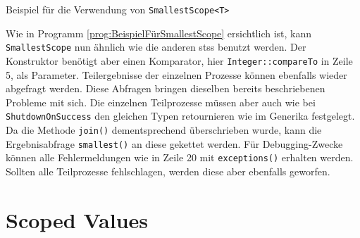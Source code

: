     \begin{program} [H]
        \caption{Beispiel für die Verwendung von \texttt{SmallestScope<T>}}
        \label{prog:VerwendungVonSmallestScope}
    \begin{JavaCode}[language=Java, numbers=left]
public static void scopesSmallest() {
    StructuredTaskScope.Subtask<Integer> result1 = null;
    Integer result = null;

    try (var scope = new SmallestScope<Integer>(Integer::compareTo)) {                                         
        result1 = scope.fork(() -> { 
            Thread.sleep(1000); 
            return 4; 
        });
        scope.fork(() -> { throw new RuntimeException("Task 2 failed"); });
        scope.fork(() -> { 
            Thread.sleep(2000); 
            return 3; 
        });

        result = scope.join().smallest();
        if (result1.state() == StructuredTaskScope.Subtask.State.SUCCESS) {
            System.out.println(STR."result from the 1st Thread: \{result1.get()}");
        }
        scope.exceptions().printStackTrace();
    } catch (Exception e) {
        e.printStackTrace();
    }
    System.out.println(STR."smallest result: \{result}");
}\end{JavaCode}
    \end{program}
    Wie in Programm \ref{prog:BeispielFürSmallestScope} ersichtlich ist, kann \texttt{SmallestScope} nun ähnlich wie die anderen \Glspl{sts} benutzt werden. Der Konstruktor benötigt
    aber einen Komparator, hier \texttt{Integer::compare\-To} in Zeile 5, als Parameter. Teilergebnisse der einzelnen Prozesse können ebenfalls wieder abgefragt werden. Diese Abfragen
    bringen dieselben bereits beschriebenen Probleme mit sich. Die einzelnen Teilprozesse müssen 
    aber auch wie bei \texttt{ShutdownOnSuccess} den gleichen Typen retournieren wie im Generika festgelegt. Da die Methode \texttt{join()} dementsprechend überschrieben
    wurde, kann die Ergebnisabfrage \texttt{smallest()} an diese gekettet werden. Für Debugging-Zwecke können alle Fehlermeldungen wie in Zeile 20 mit \texttt{exceptions()}
    erhalten werden. Sollten alle Teilprozesse fehlschlagen, werden diese aber ebenfalls geworfen. 

\section{Scoped Values}                                 %
\label{sec:Scoped Values}
    
